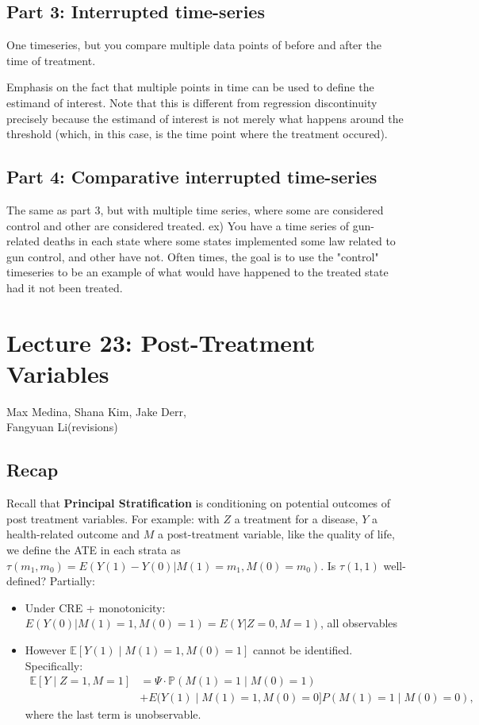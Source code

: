 \subsection*{Part 3: Interrupted time-series}
One timeseries, but you compare multiple data points of before and after the time of treatment. 

Emphasis on the fact that multiple points in time can be used to define the estimand of interest. Note that this is different from regression discontinuity precisely because the estimand of interest is not merely what happens around the threshold (which, in this case, is the time point where the treatment occured).

\subsection*{Part 4: Comparative interrupted time-series}
The same as part 3, but with multiple time series, where some are considered control and other are considered treated. 
ex) You have a time series of gun-related deaths in each state where some states implemented some law related to gun control, and other have not.
Often times, the goal is to use the "control" timeseries to be an example of what would have happened to the treated state had it not been treated.


\section{Lecture 23: Post-Treatment Variables}{Max Medina, Shana Kim, Jake Derr,\\ Fangyuan Li(revisions)}

\subsection*{Recap}
Recall that \textbf{Principal Stratification} is conditioning on potential outcomes of post treatment variables. For example: with $Z$ a treatment for a disease, $Y$ a health-related outcome and $M$ a post-treatment variable, like the quality of life, we define the ATE in each strata as $\tau(m_1,m_0)=E(Y(1)-Y(0)|M(1)=m_1,M(0)=m_0)$. Is $\tau(1,1)$ well-defined? Partially:
\begin{itemize}
    \item Under CRE + monotonicity: $E(Y(0)|M(1)=1,M(0)=1) = E(Y|Z=0,M=1)$, all observables
    \item However $\mathbb{E}[Y(1) \mid M(1) = 1, M(0) = 1]$
    cannot be identified. Specifically:
    \[\begin{split}
    \mathbb{E}[Y \mid Z = 1, M = 1] &= \Psi \cdot \mathbb{P}(M(1) = 1 \mid M(0) = 1) \\
    &+ E(Y(1) \mid M(1) = 1, M(0) =0 ] P(M(1)=1 \mid M(0)=0),
    \end{split}
    \]
    where the last term is unobservable. 
\end{itemize}

